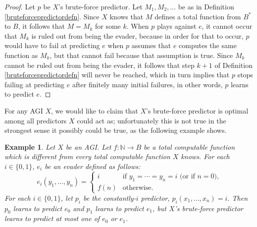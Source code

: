 \documentclass{article}
\newtheorem{example}[theorem]{Example}
\begin{document}
\begin{proof}
    Let $p$ be $X$'s brute-force predictor.
    Let $M_1,M_2,\ldots$ be as in Definition \ref{bruteforcepredictordefn}.
    Since $X$ knows that $M$ defines a total
    function from $B^*$ to $B$,
    it follows that $M=M_k$ for some $k$.
    When $p$ plays against $e$, it cannot occur that $M_k$ is ruled out
    from being the evader, because in order for that to occur, $p$ would have
    to fail at predicting $e$ when $p$ assumes that $e$ computes the same
    function as $M_k$, but that cannot fail because that assumption is true.
    Since $M_k$ cannot be ruled out from being the evader, it follows that
    step $k+1$ of Definition \ref{bruteforcepredictordefn} will never be
    reached, which in turn implies that $p$ stops failing at predicting $e$
    after finitely many initial failures, in other words, $p$ learns to
    predict $e$.
\end{proof}

For any AGI $X$, we would like to claim that $X$'s brute-force predictor is
optimal among all predictors $X$ could act as; unfortunately this
is not true in the strongest sense it possibly could be true, as the following
example shows.

\begin{example}
\label{bruteforcenottotallyoptimalexample}
    Let $X$ be an AGI. Let $f:\mathbb N\to B$ be a total computable function which
    is different from every total computable function $X$ knows.
    For each $i\in\{0,1\}$, $e_i$ be an evader defined as follows:
    \[
        e_i(y_1,\ldots,y_n) =
        \begin{cases}
            i &\mbox{if $y_1=\cdots=y_n=i$ (or if $n=0$),}\\
            f(n) &\mbox{otherwise.}
        \end{cases}
    \]
    For each $i\in\{0,1\}$, let $p_i$ be the
    constantly-$i$ predictor, $p_i(x_1,\ldots,x_n)=i$.
    Then $p_0$ learns to predict $e_0$ and $p_1$ learns to predict $e_1$,
    but $X$'s brute-force predictor learns to predict at most one of $e_0$ or $e_1$.
\end{example}
\end{document}
